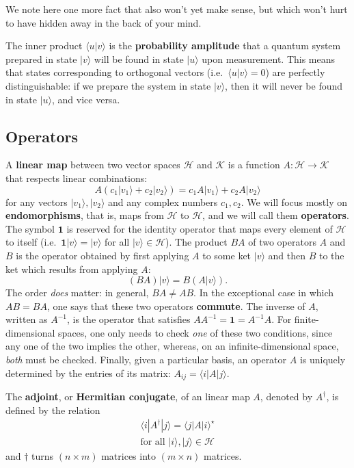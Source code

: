 \documentclass[fleqn,a4paper]{article}
\newenvironment{idea}{\everypar{\setlength{\parindent}{1.5em}}}{}
\theoremstyle{definition}
\theoremstyle{definition}
\theoremstyle{definition}
\theoremstyle{definition}
\theoremstyle{remark}
\begin{document}
We note here one more fact that also won't yet make sense, but which won't hurt to have hidden away in the back of your mind.

\begin{idea}
The inner product \(\langle u|v\rangle\) is the \textbf{probability amplitude} that a quantum system prepared in state \(|v\rangle\) will be found in state \(|u\rangle\) upon measurement.
This means that states corresponding to orthogonal vectors (i.e.~\(\langle u|v\rangle=0\)) are perfectly distinguishable: if we prepare the system in state \(|v\rangle\), then it will never be found in state \(|u\rangle\), and vice versa.

\end{idea}

\hypertarget{operators}{%
\subsection{Operators}\label{operators}}

A \textbf{linear map} between two vector spaces \(\mathcal{H}\) and \(\mathcal{K}\) is a function \(A\colon\mathcal{H}\to\mathcal{K}\) that respects linear combinations:
\[
  A(c_1|v_1\rangle+c_2|v_2\rangle)=c_1 A|v_1\rangle+c_2 A|v_2\rangle
\]
for any vectors \(|v_1\rangle,|v_2\rangle\) and any complex numbers \(c_1,c_2\).
We will focus mostly on \textbf{endomorphisms}, that is, maps from \(\mathcal{H}\) to \(\mathcal{H}\), and we will call them \textbf{operators}.
The symbol \(\mathbf{1}\) is reserved for the identity operator that maps every element of \(\mathcal{H}\) to itself (i.e.~\(\mathbf{1}|v\rangle=|v\rangle\) for all \(|v\rangle\in\mathcal{H}\)).
The product \(BA\) of two operators \(A\) and \(B\) is the operator obtained by first applying \(A\) to some ket \(|v\rangle\) and then \(B\) to the ket which results from applying \(A\):
\[
  (BA)|v\rangle = B(A|v\rangle).
\]
The order \emph{does} matter: in general, \(BA\neq AB\).
In the exceptional case in which \(AB=BA\), one says that these two operators \textbf{commute}.
The inverse of \(A\), written as \(A^{-1}\), is the operator that satisfies \(AA^{-1}=\mathbf{1}=A^{-1}A\).
For finite-dimensional spaces, one only needs to check \emph{one} of these two conditions, since any one of the two implies the other, whereas, on an infinite-dimensional space, \emph{both} must be checked.
Finally, given a particular basis, an operator \(A\) is uniquely determined by the entries of its matrix: \(A_{ij}=\langle i|A|j\rangle\).

The \textbf{adjoint}, or \textbf{Hermitian conjugate}, of an linear map \(A\), denoted by \(A^\dagger\), is defined by the relation
\[
  \begin{gathered}
    \langle i|A^\dagger|j\rangle
    = \langle j|A|i\rangle^\star
  \\\text{for all $|i\rangle,|j\rangle\in\mathcal{H}$}
  \end{gathered}
\]
and \(\dagger\) turns \((n\times m)\) matrices into \((m\times n)\) matrices.
\end{document}
